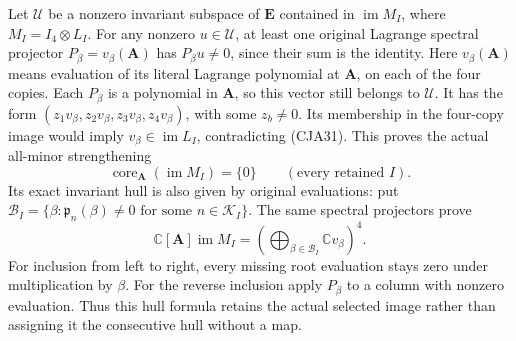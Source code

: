 Let \(\mathcal U\) be a nonzero invariant subspace of
\(\mathbf E\) contained in \(\operatorname{im}M_I\), where
\(M_I=I_4\otimes L_I\).
For any nonzero \(u\in\mathcal U\), at least one original Lagrange
spectral projector \(P_\beta=v_\beta(\mathbf A)\) has
\(P_\beta u\ne0\), since their sum is the identity.
Here \(v_\beta(\mathbf A)\) means evaluation of its literal
Lagrange polynomial at \(\mathbf A\), on each of the four copies.
Each \(P_\beta\) is a polynomial in \(\mathbf A\), so this vector
still belongs to \(\mathcal U\).
It has the form
\((z_1v_\beta,z_2v_\beta,z_3v_\beta,z_4v_\beta)\), with some
\(z_b\ne0\).
Its membership in the four-copy image would imply
\(v_\beta\in\operatorname{im}L_I\), contradicting (CJA31).
This proves the actual all-minor strengthening
\begin{equation}
 \boxed{\operatorname{core}_{\mathbf A}(\operatorname{im}M_I)
             =\{0\}\qquad(\text{every retained }I).}
 \tag{CJA32}
\end{equation}
Its exact invariant hull is also given by original evaluations:
put
\(\mathcal B_I=\{\beta:\mathfrak p_n(\beta)\ne0
\text{ for some }n\in\mathcal K_I\}\).
The same spectral projectors prove
\[
 \mathbb C[\mathbf A]\operatorname{im}M_I
   =\left(\bigoplus_{\beta\in\mathcal B_I}
                       \mathbb Cv_\beta\right)^4 .
 \]
For inclusion from left to right, every missing root evaluation
stays zero under multiplication by \(\beta\).
For the reverse inclusion apply \(P_\beta\) to a column with nonzero
evaluation.  Thus this hull formula retains the actual selected
image rather than assigning it the consecutive hull without a map.

